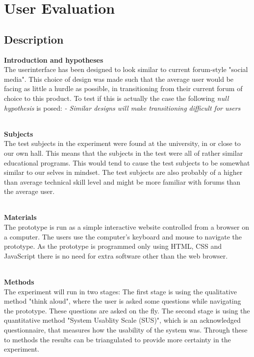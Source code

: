 \section{User Evaluation}
\subsection{Description}

\textbf{Introduction and hypotheses}\\
The userinterface has been designed to look similar to current forum-style "social media". This choice of design was made such that the average user would be facing as little a hurdle as possible, in transitioning from their current forum of choice to this product. To test if this is actually the case the following \textit{null hypothesis} is posed:\newline
\textit{- Similar designs will make transitioning difficult for users}

\noindent
\\\textbf{Subjects}\\
The test subjects in the experiment were found at the university, in or close to our own hall. This means that the subjects in the test were all of rather similar educational programs. This would tend to cause the test subjects to be somewhat similar to our selves in mindset. The test subjects are also probably of a higher than average technical skill level and might be more familiar with forums than the average user.

\noindent
\\\textbf{Materials}\\
The prototype is run as a simple interactive website controlled from a browser on a computer. The users use the computer's keyboard and mouse to navigate the prototype. As the prototype is programmed only using HTML, CSS and JavaScript there is no need for extra software other than the web browser.

\noindent
\\\textbf{Methods}\\
The experiment will run in two stages: The first stage is using the qualitative method "think aloud", where the user is asked some questions while navigating the prototype. These questions are asked on the fly. The second stage is using the quantitative method "System Usablity Scale (SUS)", which is an acknowledged questionnaire, that measures how the usability of the system was. Through these to methods the results can be triangulated to provide more certainty in the experiment.

